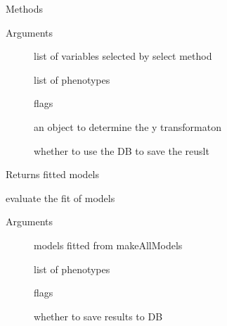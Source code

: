 \documentclass[letterpaper]{book}
\begin{document}
\begin{Section}{Methods}
\begin{SubSection}{}
%
\begin{SubSubSection}{Arguments}

\begin{description}

\item[] list of variables selected by select method
\item[] list of phenotypes
\item[] flags
\item[] an object to determine the y transformaton
\item[] whether to use the DB to save the reuslt

\end{description}



\end{SubSubSection}

%
\begin{SubSubSection}{Returns}
fitted models

\end{SubSubSection}

\end{SubSection}




\hypertarget{method-dataH-evaluateAllModels}{}
%
\begin{SubSection}{}
evaluate the fit of models
%

%
\begin{SubSubSection}{Arguments}

\begin{description}

\item[] models fitted from makeAllModels
\item[] list of phenotypes
\item[] flags
\item[] whether to save results to DB


\end{description}
\end{SubSubSection}
\end{SubSection}
\end{Section}
\end{document}
